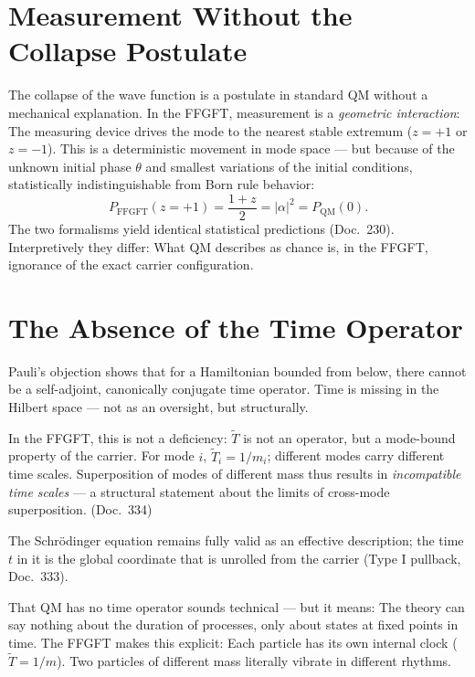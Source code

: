 \section{Measurement Without the Collapse Postulate}

The collapse of the wave function is a postulate in standard QM
without a mechanical explanation. In the FFGFT, measurement is a
\emph{geometric interaction}: The measuring device drives the mode
to the nearest stable extremum ($z=+1$ or $z=-1$). This is
a deterministic movement in mode space — but because of the
unknown initial phase $\theta$ and smallest variations of the initial conditions, statistically indistinguishable
from Born rule behavior:
\begin{equation}
  P_{\mathrm{FFGFT}}(z=+1) = \frac{1+z}{2} = |\alpha|^2 = P_{\mathrm{QM}}(0).
\end{equation}
The two formalisms yield identical statistical predictions
(Doc.~230). Interpretively they differ: What QM describes as chance
is, in the FFGFT, ignorance of the exact carrier configuration.

\section{The Absence of the Time Operator}

Pauli's objection shows that for a Hamiltonian bounded from below, there cannot be a self-adjoint, canonically conjugate
time operator. Time is missing in the Hilbert space — not as an oversight,
but structurally.

In the FFGFT, this is not a deficiency: $\tilde T$ is not an operator, but
a mode-bound property of the carrier. For mode $i$,
$\tilde T_i = 1/m_i$; different modes carry different time scales.
Superposition of modes of different mass thus results in
\emph{incompatible time scales} — a structural statement about the
limits of cross-mode superposition. (Doc.~334)

The Schrödinger equation remains fully valid as an effective description; the time $t$ in it is the global coordinate that is unrolled from the
carrier (Type I pullback, Doc.~333).

\begin{laierspur}
That QM has no time operator sounds technical — but it means:
The theory can say nothing about the duration of processes, only about
states at fixed points in time. The FFGFT makes this explicit: Each
particle has its own internal clock ($\tilde T = 1/m$). Two particles
of different mass literally vibrate in different rhythms.
\end{laierspur}
